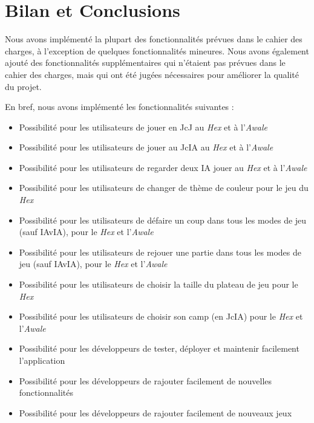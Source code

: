 \section{Bilan et Conclusions}

Nous avons implémenté la plupart des fonctionnalités prévues dans le cahier des charges, à l'exception de quelques
fonctionnalités mineures. Nous avons également ajouté des fonctionnalités supplémentaires qui n'étaient pas prévues
dans le cahier des charges, mais qui ont été jugées nécessaires pour améliorer la qualité du projet.

En bref, nous avons implémenté les fonctionnalités suivantes :

\begin{itemize}
    \item Possibilité pour les utilisateurs de jouer en JcJ au \emph{Hex} et à l'\emph{Awale}
    \item Possibilité pour les utilisateurs de jouer au JcIA au \emph{Hex} et à l'\emph{Awale}
    \item Possibilité pour les utilisateurs de regarder deux IA jouer au \emph{Hex} et à l'\emph{Awale}
    \item Possibilité pour les utilisateurs de changer de thème de couleur pour le jeu du \emph{Hex}
    \item Possibilité pour les utilisateurs de défaire un coup dans tous les modes de jeu (sauf IAvIA), pour le \emph{Hex} et l'\emph{Awale}
    \item Possibilité pour les utilisateurs de rejouer une partie dans tous les modes de jeu (sauf IAvIA), pour le \emph{Hex} et l'\emph{Awale}
    \item Possibilité pour les utilisateurs de choisir la taille du plateau de jeu pour le \emph{Hex}
    \item Possibilité pour les utilisateurs de choisir son camp (en JcIA) pour le \emph{Hex} et l'\emph{Awale}
    \item Possibilité pour les développeurs de tester, déployer et maintenir facilement l'application
    \item Possibilité pour les développeurs de rajouter facilement de nouvelles fonctionnalités
    \item Possibilité pour les développeurs de rajouter facilement de nouveaux jeux
\end{itemize}